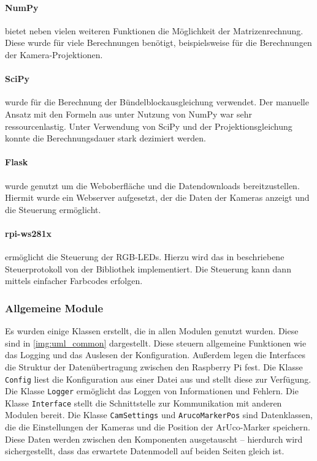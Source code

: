 \documentclass[./00PhotoBox.tex]{subfiles}
\begin{document}
\paragraph{NumPy}
bietet neben vielen weiteren Funktionen die Möglichkeit der Matrizenrechnung. Diese wurde für viele Berechnungen benötigt, beispielsweise für die Berechnungen der Kamera-Projektionen.

\paragraph{SciPy}
wurde für die Berechnung der Bündelblockausgleichung verwendet. Der manuelle Ansatz mit den Formeln aus \cite{luhmann} unter Nutzung von NumPy war sehr ressourcenlastig. Unter Verwendung von SciPy und der Projektionsgleichung konnte die Berechnungsdauer stark dezimiert werden.

\paragraph{Flask}
wurde genutzt um die Weboberfläche und die Datendownloads bereitzustellen. Hiermit wurde ein Webserver aufgesetzt, der die Daten der Kameras anzeigt und die Steuerung ermöglicht.

\paragraph{rpi-ws281x}
\label{p:ws281x}
ermöglicht die Steuerung der RGB-LEDs. Hierzu wird das in \cite{ws2811} beschriebene Steuerprotokoll von der Bibliothek implementiert. Die Steuerung kann dann mittels einfacher Farbcodes erfolgen.

\subsubsection{Allgemeine Module}
Es wurden einige Klassen erstellt, die in allen Modulen genutzt wurden. Diese sind in \autoref{img:uml_common} dargestellt. Diese steuern allgemeine Funktionen wie das Logging und das Auslesen der Konfiguration. Außerdem legen die Interfaces die Struktur der Datenübertragung zwischen den Raspberry Pi fest. Die Klasse \texttt{Config} liest die Konfiguration aus einer Datei aus und stellt diese zur Verfügung. Die Klasse \texttt{Logger} ermöglicht das Loggen von Informationen und Fehlern. Die Klasse \texttt{Interface} stellt die Schnittstelle zur Kommunikation mit anderen Modulen bereit. Die Klasse \texttt{CamSettings} und \texttt{ArucoMarkerPos} sind Datenklassen, die die Einstellungen der Kameras und die Position der ArUco-Marker speichern. Diese Daten werden zwischen den Komponenten ausgetauscht -- hierdurch wird sichergestellt, dass das erwartete Datenmodell auf beiden Seiten gleich ist.
\end{document}
